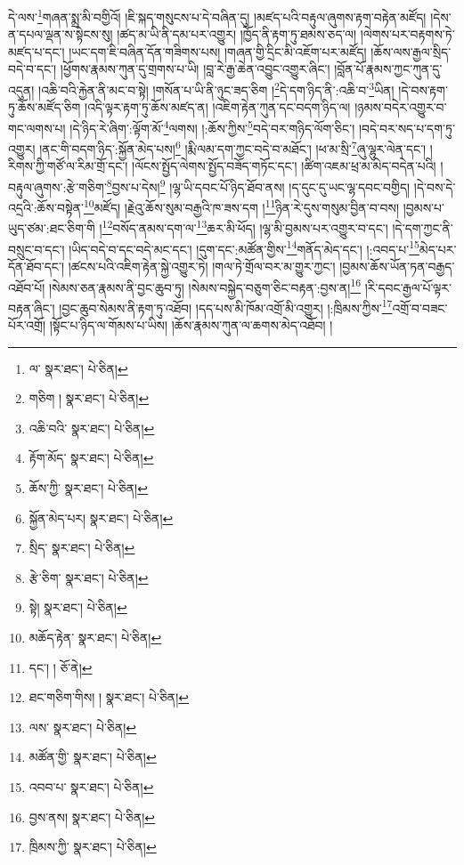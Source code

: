 དེ་ལས་\footnote{ལ་  སྣར་ཐང་།  པེ་ཅིན། }གཞན་སྨྲ་མི་བགྱིའོ། །ཇི་སྐད་གསུངས་པ་དེ་བཞིན་དུ། །མཛད་པའི་བརྟུལ་ཞུགས་རྟག་བརྟེན་མཛོད། །དེས་ན་དཔལ་ལྡན་ས་སྟེངས་སུ། །ཚད་མ་ཡི་ནི་དམ་པར་འགྱུར། །ཁྱོད་ནི་རྟག་ཏུ་ཐམས་ཅད་ལ། །ལེགས་པར་བརྟགས་ཏེ་མཛད་པ་དང་། །ཡང་དག་ཇི་བཞིན་དོན་གཟིགས་པས། །གཞན་གྱི་དྲིང་མི་འཇོག་པར་མཛོད། །ཆོས་ལས་རྒྱལ་སྲིད་བདེ་བ་དང་། །ཕྱོགས་རྣམས་ཀུན་དུ་གྲགས་པ་ཡི། །བླ་རེ་རྒྱ་ཆེན་འབྱུང་འགྱུར་ཞིང་། །བློན་པོ་རྣམས་ཀྱང་ཀུན་དུ་འདུན། །འཆི་བའི་རྐྱེན་ནི་མང་བ་སྟེ། །གསོན་པ་ཡི་ནི་ཉུང་ཟད་ཅིག །\footnote{གཅིག །  སྣར་ཐང་།  པེ་ཅིན། }དེ་དག་ཉིད་ནི་:འཆི་བ་\footnote{འཆི་བའི་  སྣར་ཐང་།  པེ་ཅིན། }ཡིན། །དེ་བས་རྟག་ཏུ་ཆོས་མཛོད་ཅིག །འདི་ལྟར་རྟག་ཏུ་ཆོས་མཛད་ན། །འཇིག་རྟེན་ཀུན་དང་བདག་ཉིད་ལ། །ཉམས་བདེར་འགྱུར་བ་གང་ལགས་པ། །དེ་ཉིད་རེ་ཞིག་:ལྟོག་མོ་\footnote{རྟོག་མོད་  སྣར་ཐང་།  པེ་ཅིན། }ལགས། །:ཆོས་ཀྱིས་\footnote{ཆོས་ཀྱི་  སྣར་ཐང་།  པེ་ཅིན། }བདེ་བར་གཉིད་ལོག་ཅིང་། །བདེ་བར་སད་པ་དག་ཏུ་འགྱུར། །ནང་གི་བདག་ཉིད་:སྐྱོན་མེད་པས།\footnote{སྐྱོན་མེད་པར།  སྣར་ཐང་།  པེ་ཅིན། } །རྨི་ལམ་དག་ཀྱང་བདེ་བ་མཐོང་། །ཕ་མ་སྲི་\footnote{སྲིད་  སྣར་ཐང་།  པེ་ཅིན། }ཞུ་ལྷུར་ལེན་དང་། །རིགས་ཀྱི་གཙོ་ལ་རིམ་གྲོ་དང་། །ལོངས་སྤྱོད་ལེགས་སྤྱོད་བཟོད་གཏོང་དང་། །ཚིག་འཇམ་ཕྲ་མ་མེད་བདེན་པའི། །བརྟུལ་ཞུགས་:རྩེ་གཅིག་\footnote{རྩེ་ཅིག་  སྣར་ཐང་།  པེ་ཅིན། }བྱས་པ་དེས།\footnote{སྟེ།  སྣར་ཐང་།  པེ་ཅིན། } །ལྷ་ཡི་དབང་པོ་ཉིད་ཐོབ་ནས། །ད་དུང་དུ་ཡང་ལྷ་དབང་བགྱིད། །དེ་བས་དེ་འདྲའི་:ཆོས་བསྟེན་\footnote{མཆོད་རྟེན་  སྣར་ཐང་།  པེ་ཅིན། }མཛོད། །རྗེའུ་ཆོས་སུམ་བརྒྱའི་ཁ་ཟས་དག །\footnote{དང་། །  ཅོ་ནེ། }ཉིན་རེ་དུས་གསུམ་བྱིན་བ་བས། །བྱམས་པ་ཡུད་ཙམ་:ཐང་ཅིག་གི །\footnote{ཐང་གཅིག་གིས། །  སྣར་ཐང་།  པེ་ཅིན། }བསོད་ནམས་དག་ལ་\footnote{ལས་  སྣར་ཐང་།  པེ་ཅིན། }ཆར་མི་ཕོད། །ལྷ་མི་བྱམས་པར་འགྱུར་བ་དང་། །དེ་དག་ཀྱང་ནི་བསྲུང་བ་དང་། །ཡིད་བདེ་བ་དང་བདེ་མང་དང་། །དུག་དང་:མཚོན་གྱིས་\footnote{མཚོན་གྱི་  སྣར་ཐང་།  པེ་ཅིན། }གནོད་མེད་དང་། །:འབད་པ་\footnote{འབབ་པ་  སྣར་ཐང་།  པེ་ཅིན། }མེད་པར་དོན་ཐོབ་དང་། །ཚངས་པའི་འཇིག་རྟེན་སྐྱེ་འགྱུར་ཏེ། །གལ་ཏེ་གྲོལ་བར་མ་གྱུར་ཀྱང་། །བྱམས་ཆོས་ཡོན་ཏན་བརྒྱད་འཐོབ་པོ། །སེམས་ཅན་རྣམས་ནི་བྱང་ཆུབ་ཏུ། །སེམས་བསྐྱེད་བཅུག་ཅིང་བརྟན་:བྱས་ན།\footnote{བྱས་ནས།  སྣར་ཐང་།  པེ་ཅིན། } །རི་དབང་རྒྱལ་པོ་ལྟར་བརྟན་ཞིང་། །བྱང་ཆུབ་སེམས་ནི་རྟག་ཏུ་འཐོབ། །དད་པས་མི་ཁོམ་འགྲོ་མི་འགྱུར། །:ཁྲིམས་ཀྱིས་\footnote{ཁྲིམས་ཀྱི་  སྣར་ཐང་།  པེ་ཅིན། }འགྲོ་བ་བཟང་པོར་འགྲོ། །སྟོང་པ་ཉིད་ལ་གོམས་པ་ཡིས། །ཆོས་རྣམས་ཀུན་ལ་ཆགས་མེད་འཐོབ། །

